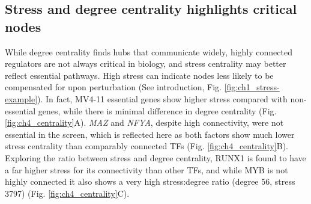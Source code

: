 

\subsection{Stress and degree centrality highlights critical nodes}

While degree centrality finds hubs that communicate widely, highly connected regulators are not always critical in biology, and stress centrality may better reflect essential pathways. High stress can indicate nodes less likely to be compensated for upon perturbation (See introduction, Fig. \ref{fig:ch1_stress-example}). In fact, MV4-11 essential genes show higher stress compared with non-essential genes, while there is minimal difference in degree centrality (Fig. \ref{fig:ch4_centrality}A). \textit{MAZ} and \textit{NFYA}, despite high connectivity, were not essential in the \cite{tzelepis_crispr_2016} screen, which is reflected here as both factors show much lower stress centrality than comparably connected TFs (Fig. \ref{fig:ch4_centrality}B). Exploring the ratio between stress and degree centrality, RUNX1 is found to have a far higher stress for its connectivity than other TFs, and while MYB is not highly connected it also shows a very high stress:degree ratio (degree 56, stress 3797) (Fig. \ref{fig:ch4_centrality}C).

